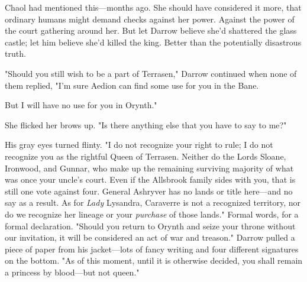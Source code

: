 Chaol had mentioned this---months ago. She should have considered it more, that ordinary humans might demand checks against her power. Against the power of the court gathering around her. But let Darrow believe she'd shattered the glass castle; let him believe she'd killed the king. Better than the potentially disastrous truth.

"Should you still wish to be a part of Terrasen," Darrow continued when none of them replied, "I'm sure Aedion can find some use for you in the Bane.

But I will have no use for you in Orynth."

She flicked her brows up. "Is there anything else that you have to say to me?"

His gray eyes turned flinty. "I do not recognize your right to rule; I do not recognize you as the rightful Queen of Terrasen. Neither do the Lords Sloane, Ironwood, and Gunnar, who make up the remaining surviving majority of what was once your uncle's court. Even if the Allsbrook family sides with you, that is still one vote against four. General Ashryver has no lands or title here---and no say as a result. As for
\emph{Lady} Lysandra, Caraverre is not a recognized territory, nor do we recognize her lineage or your \emph{purchase} of those lands." Formal words, for a formal declaration. "Should you return to Orynth and seize your throne without our invitation, it will be considered an act of war and treason." Darrow pulled a piece of paper from his jacket---lots of fancy writing and four different signatures on the bottom. "As of this moment, until it is otherwise decided, you shall remain a princess by blood---but not queen."
